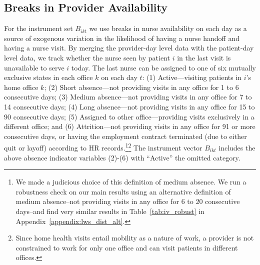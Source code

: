 \documentclass[final,12pt, notitlepage]{article}
\begin{document}
\subsection{Breaks in Provider Availability} \label{sec:availability}
For the instrument set $B_{ikt}$ we use breaks in nurse availability on each day as a source of exogenous variation in the likelihood of having a nurse handoff and having a nurse visit.
By merging the provider-day level data with the patient-day level data, we track whether the  nurse seen by patient $i$ in the last visit is unavailable to serve $i$ today.
The last nurse can be assigned to one of six mutually exclusive states in each office $k$ on each day $t$:
(1) Active---visiting patients in $i$'s home office $k$;
(2) Short absence---not providing visits in any office for 1 to 6 consecutive days;
(3) Medium absence---not providing visits in any office for 7 to 14 consecutive days;
(4) Long absence---not providing visits in any office for 15 to 90 consecutive days;
(5) Assigned to other office---providing visits exclusively in a different office; and
(6) Attrition---not providing visits in any office for 91 or more consecutive days, or having the employment contract terminated (due to either quit or layoff) according to HR records.\footnote{We made a judicious choice of this definition of medium absence. We run a robustness check on our main results using an alternative definition of medium absence--not providing visits in any office for 6 to 20 consecutive days--and find very similar results in Table~\ref{tab:iv_robust} in Appendix~\ref{appendix:lws_dist_alt}.
}\footnote{Since home health visits entail mobility as a nature of work, a provider is not constrained to work for only one office and can visit patients in different offices.
}
The instrument vector $B_{ikt}$ includes the above absence indicator variables (2)-(6) with ``Active'' the omitted category.
\end{document}
